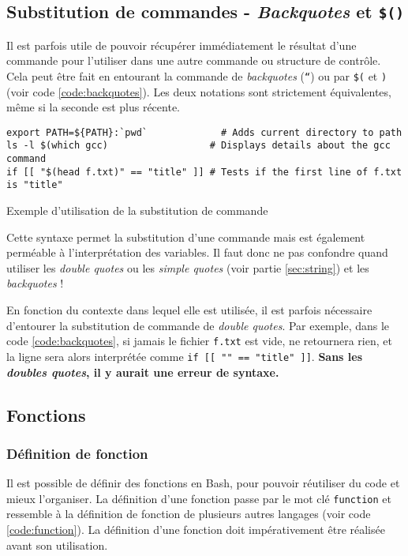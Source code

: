 \subsection{Substitution de commandes - \textit{Backquotes} et \texttt{\$()}} \label{sec:backquotes}


Il est parfois utile de pouvoir récupérer immédiatement le résultat d’une commande pour l’utiliser dans une autre commande ou structure de contrôle. Cela peut être fait en entourant la commande de \textit{backquotes} (\texttt{``}) ou par \texttt{\$(} et \texttt{)} (voir code \ref{code:backquotes}).
Les deux notations sont strictement équivalentes, même si la seconde est plus récente.

\begin{code}
\begin{verbatim}
export PATH=${PATH}:`pwd`             # Adds current directory to path
ls -l $(which gcc)                  # Displays details about the gcc command
if [[ "$(head f.txt)" == "title" ]] # Tests if the first line of f.txt is "title"
\end{verbatim}
\vspace{-5mm}
\caption{Exemple d'utilisation de la substitution de commande}
    \label{code:backquotes}
\end{code}

 Cette syntaxe permet la substitution d'une commande mais est également perméable à l'interprétation des variables. Il faut donc ne pas confondre quand utiliser les \textit{double quotes} ou les \textit{simple quotes} (voir partie \ref{sec:string}) et les \textit{backquotes} !

 En fonction du contexte dans lequel elle est utilisée, il est parfois nécessaire d'entourer la substitution de commande de \textit{double quotes}. Par exemple, dans le code \ref{code:backquotes}, si jamais le fichier \texttt{f.txt} est vide,  ne retournera rien, et la ligne sera alors interprétée comme \texttt{if [[ "" == "title" ]]}. \textbf{Sans les \textit{doubles quotes}, il y aurait une erreur de syntaxe.}

\vspace{-5mm}
\subsection{Fonctions} \label{sec:functions}
\vspace{-7mm}

\subsubsection{Définition de fonction}
Il est possible de définir des fonctions en Bash, pour pouvoir réutiliser du code et mieux l'organiser. La définition d'une fonction passe par le mot clé \texttt{function} et ressemble à la définition de fonction de plusieurs autres langages (voir code \ref{code:function}). La définition d'une fonction doit impérativement être réalisée avant son utilisation.

